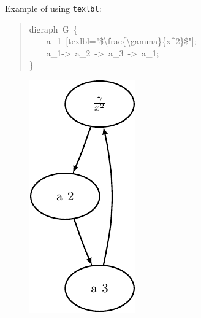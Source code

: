 \documentclass[10pt,a4paper,english]{article}
\begin{document}
Example of using \texttt{texlbl}:
\begin{quote}{\ttfamily \raggedright \noindent
digraph~G~{\{}~\\
~~~~a{\_}1~{[}texlbl="{\$}{\textbackslash}frac{\{}{\textbackslash}gamma{\}}{\{}x{\textasciicircum}2{\}}{\$}"{]};~\\
~~~~a{\_}1->~a{\_}2~->~a{\_}3~->~a{\_}1;~\\
{\}}
}\end{quote}
\begin{figure}[H]
\centering

\includegraphics{pdf/ex2}
\end{figure}
\end{document}
